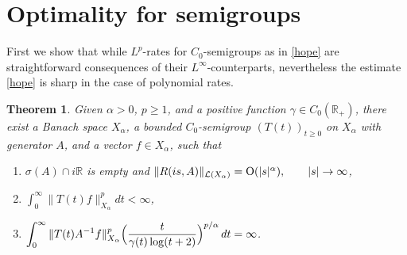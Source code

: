 \documentclass[11pt]{amsart}
\newtheorem{theorem}{Theorem}[section]
\theoremstyle{definition}
\theoremstyle{remark}
\numberwithin{equation}{section}
\begin{document}
\section{Optimality for semigroups}\label{se7}

First we show that while $L^p$-rates for $C_0$-semigroups as in \eqref{hope} are straightforward consequences of their $L^{\infty}$-counterparts, nevertheless the estimate \eqref{hope} is sharp in the case of polynomial rates.

\begin{theorem}\label{xyz}
Given $\alpha > 0$, $p\ge 1$, and a positive function $\gamma\in C_0(\mathbb R_+)$, there exist a Banach space $X_{\alpha}$, a
bounded $C_0$-semigroup \newline\noindent
$(T(t))_{t \ge 0}$ on $X_{\alpha}$ with
generator $A$, and a vector $f\in X_{\alpha}$, such that
\begin{enumerate} [\rm (a)]
\item \label{71a} $\sigma(A) \cap i{{\mathbb R}}$ is empty and $\|R(is,A)\|_{\mathcal{L}(X_\alpha)}={\rm O}(|s|^{\alpha}), \qquad |s| \to \infty$, \smallskip
\item \label{71b} $\displaystyle \int_0^\infty \|T(t)f\|^p_{X_{\alpha}}dt<\infty$, \smallskip
\item \label{71c} $\displaystyle \int_0^\infty\|T(t)A^{-1}f\|^p_{X_{\alpha}} \Bigl(\frac{t}{\gamma(t)\log (t+2)}\Bigr)^{p/\alpha}
\,dt=\infty$.
\end{enumerate}
\end{theorem}
\end{document}
